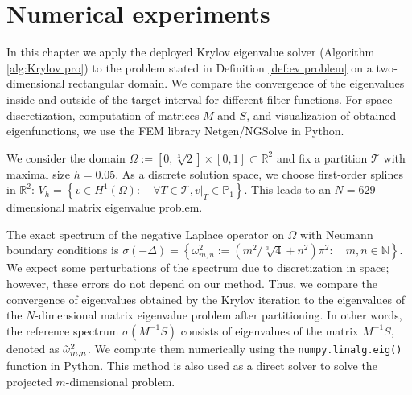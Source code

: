 \documentclass[a4paper,11pt,bibliography=totoc,listof=totoc,headinclude=true,cleardoublepage=empty,oneside]{scrbook}
\newcommand{\R}{\mathbb{R}}
\newcommand{\N}{\mathbb{N}}
\newcommand{\dffv}{\Tilde{\beta}_{\Vec{\alpha}}}
\newcommand{\e}{\mathrm{end}}
\begin{document}

\chapter{Numerical experiments}\label{chapter:experiments}
In this chapter we apply the deployed Krylov eigenvalue solver (Algorithm \ref{alg:Krylov pro}) to the problem stated in Definition \ref{def:ev problem} on a two-dimensional rectangular domain. We compare the convergence of the eigenvalues inside and outside of the target interval for different filter functions. For space discretization, computation of matrices $M$ and $S$, and visualization of obtained eigenfunctions, we use the FEM library Netgen/NGSolve in Python.

We consider the domain $\Omega := \left[0, \sqrt[3]{2}\right]\times\left[0, 1\right] \subset \R^2$ and fix a partition $\mathcal{T}$ with maximal size $h = 0.05$. As a discrete solution space, we choose first-order splines in $\R^2$: $V_h = \left\{v \in H^1(\Omega) : \quad \forall T \in \mathcal{T}, v|_T \in \mathbb{P}_1\right\}$. This leads to an $N=629$-dimensional matrix eigenvalue problem. 

The exact spectrum of the negative Laplace operator on $\Omega$ with Neumann boundary conditions is $ \sigma(-\Delta) = \left\{\omega^2_{m,n} := \left(m^2/\sqrt[3]{4} + n^2\right)\pi^2 : \quad m, n \in \N \right\}$. We expect some perturbations of the spectrum due to discretization in space; however, these errors do not depend on our method. Thus, we compare the convergence of eigenvalues obtained by the Krylov iteration to the eigenvalues of the $N$-dimensional matrix eigenvalue problem after partitioning. In other words, the reference spectrum $\sigma(M^{-1}S)$ consists of eigenvalues of the matrix $M^{-1}S$, denoted as $\Tilde{\omega}_{m,n}^2$. We compute them numerically using the \texttt{numpy.linalg.eig()} function in Python. This method is also used as a direct solver to solve the projected $m$-dimensional problem.
\end{document}
